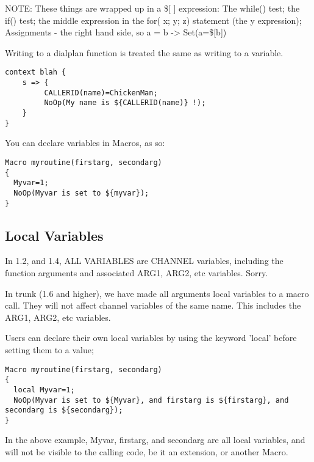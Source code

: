 {NOTE: These things are wrapped up in a \$[ ] expression: The while() test;
the if() test; the middle expression in the for( x; y; z) statement
(the y expression); Assignments - the right hand side, so a = b -> Set(a=\$[b])

Writing to a dialplan function is treated the same as writing to a variable.

\begin{astlisting}
\begin{verbatim}
context blah {
    s => {
         CALLERID(name)=ChickenMan;
         NoOp(My name is ${CALLERID(name)} !);
    }
}
\end{verbatim}
\end{astlisting}

You can declare variables in Macros, as so:

\begin{astlisting}
\begin{verbatim}
Macro myroutine(firstarg, secondarg)
{
  Myvar=1;
  NoOp(Myvar is set to ${myvar});
}
\end{verbatim}
\end{astlisting}

\subsection{Local Variables}

In 1.2, and 1.4, ALL VARIABLES are CHANNEL variables, including the function
arguments and associated ARG1, ARG2, etc variables. Sorry.

In trunk (1.6 and higher), we have made all arguments local variables to
a macro call. They will not affect channel variables of the same name.
This includes the ARG1, ARG2, etc variables.

Users can declare their own local variables by using the keyword 'local'
before setting them to a value;

\begin{astlisting}
\begin{verbatim}
Macro myroutine(firstarg, secondarg)
{
  local Myvar=1;
  NoOp(Myvar is set to ${Myvar}, and firstarg is ${firstarg}, and secondarg is ${secondarg});
}
\end{verbatim}
\end{astlisting}

In the above example, Myvar, firstarg, and secondarg are all local variables,
and will not be visible to the calling code, be it an extension, or another Macro.

}
